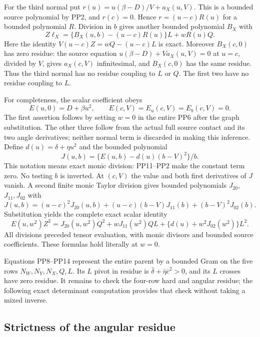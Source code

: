 For the third normal put
$r(u)=u(\beta-D)/V+a_X(u,V)$. This is a bounded source
polynomial by PP2, and $r(c)=0$. Hence $r=(u-c)R(u)$ for
a bounded polynomial $R$. Division in $b$ gives another bounded
polynomial $B_X$ with
\[
 Z\ell_X=\{B_X(u,b)-(u-c)R(u)\}L+wR(u)Q.
 \tag{PP10}
\]
Here the identity $V(u-c)Z=wQ-(u-c)L$ is exact. Moreover
$B_X(c,0)$ has zero residue: the source equation
$u(\beta-D)+Va_X(u,V)=0$ at $u=c$, divided by $V$,
gives $a_X(c,V)$ infinitesimal, and $B_X(c,0)$ has the same
residue. Thus the third normal has no residue coupling to $L$
or $Q$. The first two have no residue coupling to $L$.

For completeness, the scalar coefficient obeys
\[
 E(u,0)=D+\beta u^2,\qquad
 E(c,V)=E_u(c,V)=E_b(c,V)=0.
 \tag{PP11}
\]
The first assertion follows by setting $w=0$ in the entire PP6
after the graph substitution. The other three follow from the
actual full source contact and its two angle derivatives; neither
normal term is discarded in making this inference.
Define $d(u)=\delta+\eta u^2$ and the bounded polynomial
\[
 J(u,b)=\{E(u,b)-d(u)(b-V)^2\}/b.
 \tag{PP12}
\]
This notation means exact monic division: PP11--PP2 make the
constant term zero. No testing $b$ is inverted. At $(c,V)$
the value and both first derivatives of $J$ vanish. A second
finite monic Taylor division gives bounded polynomials $J_{20}$,
$J_{11},J_{02}$ with
\[
 J(u,b)=(u-c)^2J_{20}(u,b)
       +(u-c)(b-V)J_{11}(b)+(b-V)^2J_{02}(b).
 \tag{PP13}
\]
Substitution yields the complete exact scalar identity
\[
 E(u,w^2)Z^2=J_{20}(u,w^2)Q^2+wJ_{11}(w^2)QL
                     +\{d(u)+w^2J_{02}(w^2)\}L^2.
 \tag{PP14}
\]
All divisions preceded tensor evaluation, with monic divisors and
bounded source coefficients. These formulas hold literally at $w=0$.

Equations PP8--PP14 represent the entire parent by a bounded
Gram on the five rows $N_W,N_Y,N_X,Q,L$. Its $L$ pivot in
residue is $\bar\delta+\bar\eta\bar c^2>0$, and its $L$
crosses have zero residue. It remains to check the four-row hard
and angular residue; the following exact determinant computation
provides that check without taking a mixed inverse.

\subsection{Strictness of the angular residue}


